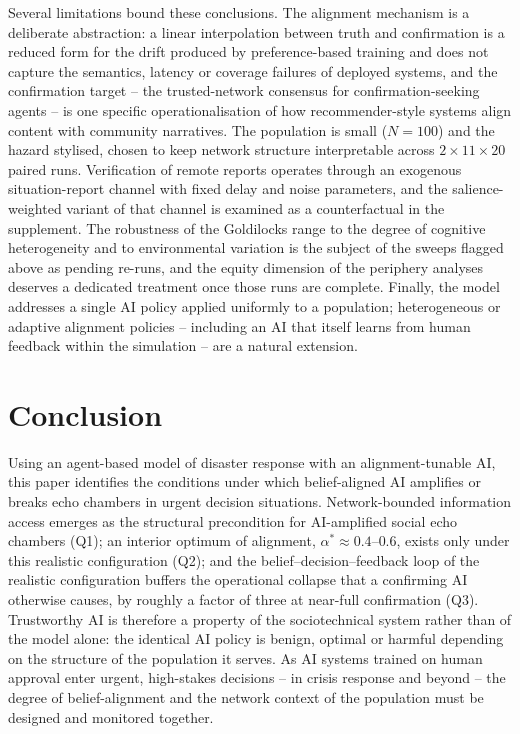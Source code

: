 \documentclass[pdflatex,sn-basic]{sn-jnl}
\begin{document}
Several limitations bound these conclusions. The alignment mechanism is a deliberate abstraction: a linear interpolation between truth and confirmation is a reduced form for the drift produced by preference-based training \citep{sharma2024sycophancy} and does not capture the semantics, latency or coverage failures of deployed systems, and the confirmation target -- the trusted-network consensus for confirmation-seeking agents -- is one specific operationalisation of how recommender-style systems align content with community narratives. The population is small ($N = 100$) and the hazard stylised, chosen to keep network structure interpretable across $2 \times 11 \times 20$ paired runs. Verification of remote reports operates through an exogenous situation-report channel with fixed delay and noise parameters, and the salience-weighted variant of that channel is examined as a counterfactual in the supplement. The robustness of the Goldilocks range to the degree of cognitive heterogeneity and to environmental variation is the subject of the sweeps flagged above as pending re-runs, and the equity dimension of the periphery analyses deserves a dedicated treatment once those runs are complete. Finally, the model addresses a single AI policy applied uniformly to a population; heterogeneous or adaptive alignment policies -- including an AI that itself learns from human feedback within the simulation -- are a natural extension.

\section{Conclusion}\label{sec:conclusion}

Using an agent-based model of disaster response with an alignment-tunable AI, this paper identifies the conditions under which belief-aligned AI amplifies or breaks echo chambers in urgent decision situations. Network-bounded information access emerges as the structural precondition for AI-amplified social echo chambers (Q1); an interior optimum of alignment, $\alpha^{*} \approx 0.4$--$0.6$, exists only under this realistic configuration (Q2); and the belief--decision--feedback loop of the realistic configuration buffers the operational collapse that a confirming AI otherwise causes, by roughly a factor of three at near-full confirmation (Q3). Trustworthy AI is therefore a property of the sociotechnical system rather than of the model alone: the identical AI policy is benign, optimal or harmful depending on the structure of the population it serves. As AI systems trained on human approval enter urgent, high-stakes decisions -- in crisis response and beyond -- the degree of belief-alignment and the network context of the population must be designed and monitored together.
\end{document}
